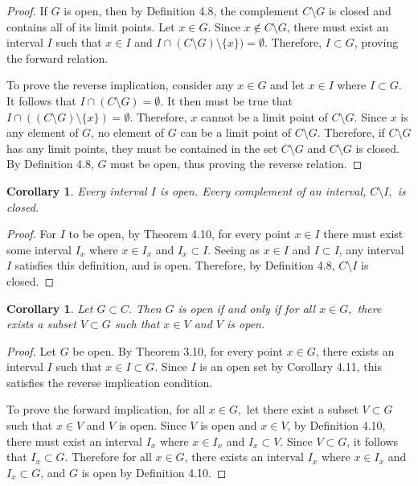\documentclass{amsart}
\newtheorem{corollary}[theorem]{Corollary}
\newcommand{\1}{\mathds{1}}
\numberwithin{equation}{section}
\numberwithin{theorem}{section}
\begin{document}
\begin{proof}
	If $G$ is open, then by Definition 4.8, the complement $C\setminus G$ is closed and contains all of its limit points. Let $x\in G$. Since $x\notin C\setminus G$, there must exist an interval $I$ such that $x\in I$ and $I\cap (C\setminus G)\setminus \{x\}) = \emptyset$. Therefore, $I\subset G$, proving the forward relation.
	
	To prove the reverse implication, consider any $x\in G$ and let $x\in I$ where $I\subset G$. It follows that $I\cap (C\setminus G) = \emptyset$. It then must be true that $I\cap ((C\setminus G)\setminus \{x\})  = \emptyset$. Therefore, $x$ cannot be a limit point of $C\setminus G$. Since $x$ is any element of $G$, no element of $G$ can be a limit point of $C\setminus G$. Therefore, if $C\setminus G$ has any limit points, they must be contained in the set $C\setminus G$ and $C\setminus G$ is closed. By Definition 4.8, $G$ must be open, thus proving the reverse relation.
\end{proof}

\begin{corollary}  Every interval $I$ is open.  Every complement of an interval, $C \setminus I,$ is closed.
\end{corollary}

\begin{proof}
	For $I$ to be open, by Theorem 4.10, for every point $x\in I$ there must exist some interval $I_x$ where $x\in I_x$ and $I_x\subset I$. Seeing as $x\in I$ and $I\subset I$, any interval $I$ satisfies this definition, and is open. Therefore, by Definition 4.8, $C\setminus I$ is closed.
\end{proof}

\begin{corollary} Let $G\subset C.$ Then $G$ is open if and only if for all $x\in G,$ there exists a subset $V\subset G$ such that $x\in V$ and $V$ is open. 
\end{corollary} 

\begin{proof}
	Let $G$ be open. By Theorem 3.10, for every point $x \in G$, there exists an interval $I$ such that $x \in I \subset G$. Since $I$ is an open set by Corollary 4.11, this satisfies the reverse implication condition.
	
	To prove the forward implication, for all $x\in G,$ let there exist a subset $V\subset G$ such that $x\in V$ and $V$ is open. Since $V$ is open and $x\in V$, by Definition 4.10, there must exist an interval $I_x$ where $x\in I_x$ and $I_x\subset V$. Since $V\subset G$, it follows that $I_x\subset G$. Therefore for all $x\in G$, there exists an interval $I_x$ where $x\in I_x$ and $I_x\subset G$, and $G$ is open by Definition 4.10.
\end{proof}
\end{document}
